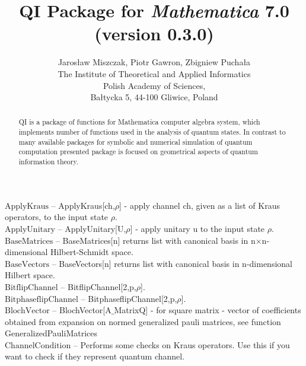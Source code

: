 \documentclass[a4paper,10pt]{scrartcl}
\begin{document}
\title{QI Package for \emph{Mathematica} 7.0 (version 0.3.0)}\author{Jaros{\l}aw Miszczak, Piotr Gawron, Zbigniew Pucha{\l}a\\ \small{The Institute of Theoretical and Applied Informatics}\\
\small{Polish Academy of Sciences},\\ \small{Ba{\l}tycka 5, 44-100 Gliwice, Poland}}
\maketitle
\begin{abstract}QI is a package of functions for Mathematica computer algebra system, which implements 
number of functions used in the analysis of quantum states. In contrast to many available 
packages for symbolic and numerical simulation of quantum computation presented package is focused 
on geometrical aspects of quantum information theory.\end{abstract}
\textbf{$ \text{ApplyKraus} $ }-- ApplyKraus[ch,$\rho $] - apply channel ch, given as a list of Kraus operators, to the input state $\rho $.$  $\\

\textbf{$ \text{ApplyUnitary} $ }-- ApplyUnitary[U,$\rho $] - apply unitary u to the input state $\rho $.$  $\\

\textbf{$ \text{BaseMatrices} $ }-- BaseMatrices[n] returns list with canonical basis in n$\times $n-dimensional Hilbert-Schmidt space.$  $\\

\textbf{$ \text{BaseVectors} $ }-- BaseVectors[n] returns list with canonical basis in n-dimensional Hilbert space.$  $\\

\textbf{$ \text{BitflipChannel} $ }-- BitflipChannel[2,p,$\rho $].$  $\\

\textbf{$ \text{BitphaseflipChannel} $ }-- BitphaseflipChannel[2,p,$\rho $].$  $\\

\textbf{$ \text{BlochVector} $ }-- BlochVector[A$\_$MatrixQ] - for square matrix - vector of coefficients obtained from expansion on normed generalized pauli matrices, see function GeneralizedPauliMatrices$  $\\

\textbf{$ \text{ChannelCondition} $ }-- Performs some checks on Kraus operators. Use this if you want to check if they represent quantum channel.$  $\\
\end{document}
